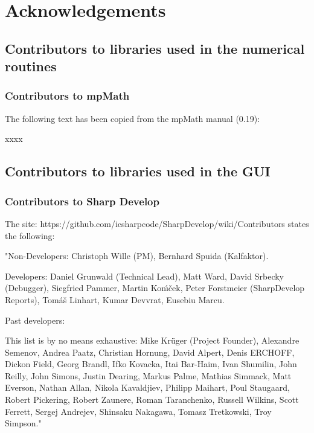 \chapter{Acknowledgements} 

\section{Contributors to libraries used in the numerical routines}


\subsection{Contributors to mpMath}
\label{Contributors to mpMath}
The following text has been copied from the mpMath manual (0.19):

\vpara
xxxx




\section{Contributors to libraries used in the GUI}

\subsection{Contributors to Sharp Develop}
\label{Contributors to SharpDevelop}

The site: 
https://github.com/icsharpcode/SharpDevelop/wiki/Contributors
states the following:

\vpara
"Non-Developers: 
Christoph Wille (PM), 
Bernhard Spuida (Kalfaktor).

\vpara
Developers: 
Daniel Grunwald (Technical Lead), 
Matt Ward, 
David Srbecky (Debugger), 
Siegfried Pammer, 
Martin Kon\'{\i}\v{c}ek, 
Peter Forstmeier (SharpDevelop Reports), 
Tom\'{a}\v{s} Linhart, 
Kumar Devvrat, 
Eusebiu Marcu.

\vpara
Past developers: 

This list is by no means exhaustive:
Mike Kr\"{u}ger (Project Founder), 
Alexandre Semenov, 
Andrea Paatz, 
Christian Hornung, 
David Alpert, 
Denis ERCHOFF, 
Dickon Field, 
Georg Brandl, 
Ifko Kovacka, 
Itai Bar-Haim, 
Ivan Shumilin, 
John Reilly, 
John Simons, 
Justin Dearing, 
Markus Palme, 
Mathias Simmack, 
Matt Everson, 
Nathan Allan, 
Nikola Kavaldjiev, 
Philipp Maihart, 
Poul Staugaard, 
Robert Pickering, 
Robert Zaunere, 
Roman Taranchenko, 
Russell Wilkins, 
Scott Ferrett, 
Sergej Andrejev, 
Shinsaku Nakagawa, 
Tomasz Tretkowski, 
Troy Simpson."




